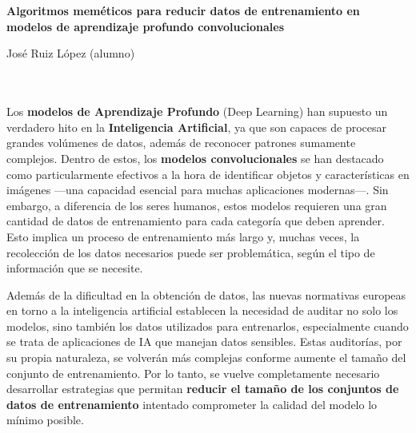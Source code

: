 
\chapter*{}



\cleardoublepage
\thispagestyle{empty}

\begin{center}
       {\large\bfseries Algoritmos meméticos para reducir datos de entrenamiento en modelos de aprendizaje profundo
              convolucionales}\\
\end{center}
\begin{center}
       José Ruiz López (alumno)\\
\end{center}

\\

\vspace{0.7cm}
\\

Los \textbf{modelos de Aprendizaje Profundo} (Deep Learning) han supuesto un verdadero hito en la
\textbf{Inteligencia Artificial}, ya que son capaces de procesar grandes volúmenes de datos, además de reconocer
patrones sumamente complejos.
Dentro de estos, los \textbf{modelos convolucionales} se han destacado como particularmente efectivos a la hora de
identificar objetos y características en imágenes —una capacidad esencial para muchas aplicaciones modernas—.
Sin embargo, a diferencia de los seres humanos, estos modelos requieren una gran cantidad de datos de
entrenamiento para cada categoría que deben aprender.
Esto implica un proceso de entrenamiento más largo y, muchas veces, la recolección de los datos necesarios puede ser
problemática, según el tipo de información que se necesite.

Además de la dificultad en la obtención de datos,  las nuevas normativas europeas en torno a la inteligencia artificial
establecen la necesidad de auditar no solo los modelos, sino también los datos
utilizados para entrenarlos, especialmente cuando se trata de aplicaciones de IA que manejan datos sensibles.
Estas auditorías, por su propia naturaleza, se volverán más complejas conforme aumente el tamaño del conjunto de
entrenamiento.
Por lo tanto, se vuelve completamente necesario desarrollar estrategias que permitan
\textbf{reducir el tamaño de los conjuntos de datos de entrenamiento} intentado comprometer la calidad del modelo lo mínimo posible.

